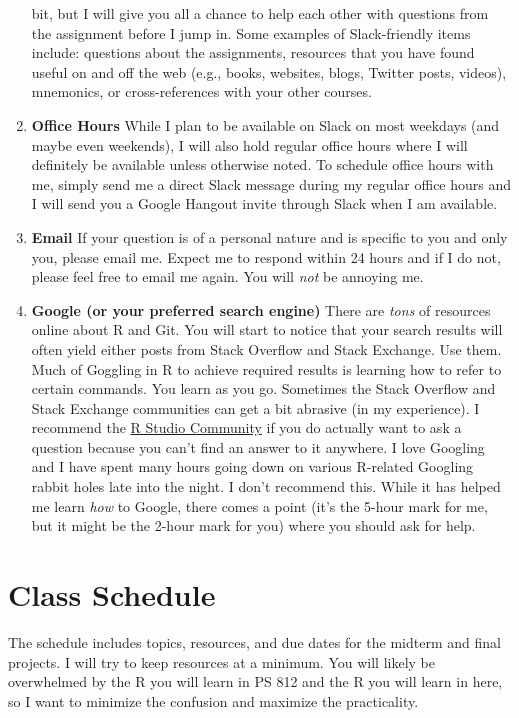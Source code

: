 \documentclass[11pt,]{article}
\begin{document}
\begin{enumerate}
  bit, but I will give you all a chance to help each other with
  questions from the assignment before I jump in. Some examples of
  Slack-friendly items include: questions about the assignments,
  resources that you have found useful on and off the web (e.g., books,
  websites, blogs, Twitter posts, videos), mnemonics, or
  cross-references with your other courses.
\item
  \textbf{Office Hours} While I plan to be available on Slack on most
  weekdays (and maybe even weekends), I will also hold regular office
  hours where I will definitely be available unless otherwise noted. To
  schedule office hours with me, simply send me a direct Slack message
  during my regular office hours and I will send you a Google Hangout
  invite through Slack when I am available.
\item
  \textbf{Email} If your question is of a personal nature and is
  specific to you and only you, please email me. Expect me to respond
  within 24 hours and if I do not, please feel free to email me again.
  You will \emph{not} be annoying me.
\item
  \textbf{Google (or your preferred search engine)} There are
  \emph{tons} of resources online about R and Git. You will start to
  notice that your search results will often yield either posts from
  Stack Overflow and Stack Exchange. Use them. Much of Goggling in R to
  achieve required results is learning how to refer to certain commands.
  You learn as you go. Sometimes the Stack Overflow and Stack Exchange
  communities can get a bit abrasive (in my experience). I recommend the
  \href{https://community.rstudio.com/}{R Studio Community} if you do
  actually want to ask a question because you can't find an answer to it
  anywhere. I love Googling and I have spent many hours going down on
  various R-related Googling rabbit holes late into the night. I don't
  recommend this. While it has helped me learn \emph{how} to Google,
  there comes a point (it's the 5-hour mark for me, but it might be the
  2-hour mark for you) where you should ask for help.
\end{enumerate}

\hypertarget{class-schedule}{%
\section{Class Schedule}\label{class-schedule}}

The schedule includes topics, resources, and due dates for the midterm
and final projects. I will try to keep resources at a minimum. You will
likely be overwhelmed by the R you will learn in PS 812 and the R you
will learn in here, so I want to minimize the confusion and maximize the
practicality.
\end{document}
